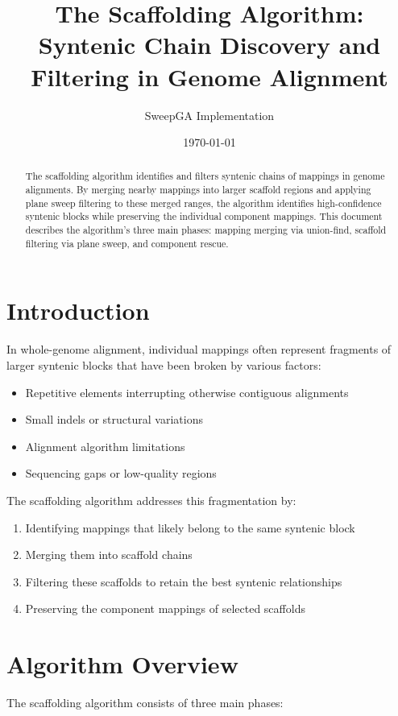 \documentclass[11pt]{article}
\title{The Scaffolding Algorithm: \\ Syntenic Chain Discovery and Filtering in Genome Alignment}
\author{SweepGA Implementation}
\date{\today}
\begin{document}
\maketitle

\begin{abstract}
The scaffolding algorithm identifies and filters syntenic chains of mappings in genome alignments. By merging nearby mappings into larger scaffold regions and applying plane sweep filtering to these merged ranges, the algorithm identifies high-confidence syntenic blocks while preserving the individual component mappings. This document describes the algorithm's three main phases: mapping merging via union-find, scaffold filtering via plane sweep, and component rescue.
\end{abstract}

\section{Introduction}

In whole-genome alignment, individual mappings often represent fragments of larger syntenic blocks that have been broken by various factors:
\begin{itemize}
    \item Repetitive elements interrupting otherwise contiguous alignments
    \item Small indels or structural variations
    \item Alignment algorithm limitations
    \item Sequencing gaps or low-quality regions
\end{itemize}

The scaffolding algorithm addresses this fragmentation by:
\begin{enumerate}
    \item Identifying mappings that likely belong to the same syntenic block
    \item Merging them into scaffold chains
    \item Filtering these scaffolds to retain the best syntenic relationships
    \item Preserving the component mappings of selected scaffolds
\end{enumerate}

\section{Algorithm Overview}

The scaffolding algorithm consists of three main phases:
\end{document}
